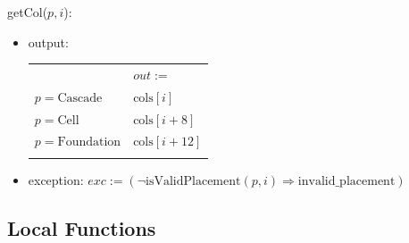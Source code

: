 \documentclass[12pt]{article}
\newcommand{\Implies}{\Rightarrow}
\begin{document}
\noindent getCol($p, i$):
\begin{itemize}
    \item output:
        \begin{tabular}[t]{|l|l|}
            \hhline{~|-|}
            \multicolumn{1}{r|}{} & $out :=$\\
            \hhline{-|-|}
            $p = \mbox{Cascade}$ & $\mbox{cols}[i]$\\
            \hhline{|-|-|}
            $p = \mbox{Cell}$ & $\mbox{cols}[i + 8]$\\
            \hhline{|-|-|}
            $p = \mbox{Foundation}$ & $\mbox{cols}[i + 12]$\\
            \hhline{|-|-|}
        \end{tabular}
    \item exception: $exc := (\lnot \mbox{isValidPlacement}(p, i) \Implies \mbox{invalid\_placement})$
\end{itemize}

\subsection*{Local Functions}
\end{document}

